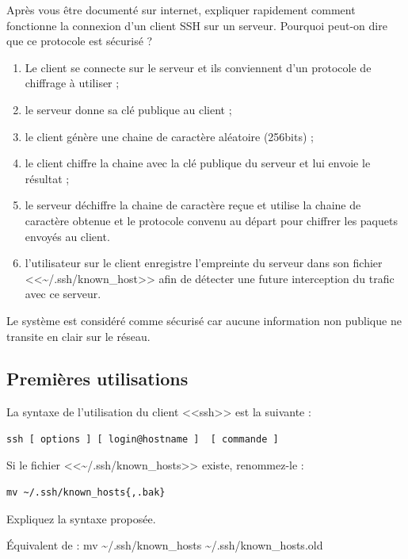 \documentclass[11pt]{article}
\begin{document}
Après vous être documenté sur internet, expliquer rapidement comment fonctionne la connexion d'un client SSH sur un serveur. Pourquoi peut-on dire que ce protocole est sécurisé ?

\begin{solution}
\begin{enumerate}
 \item Le client se connecte sur le serveur et ils conviennent d'un protocole de chiffrage à utiliser ;
 \item le serveur donne sa clé publique au client ;
 \item le client génère une chaine de caractère aléatoire (256bits) ;
 \item le client chiffre la chaine avec la clé publique du serveur et lui envoie le résultat ;
 \item le serveur déchiffre la chaine de caractère reçue et utilise la chaine de caractère obtenue et le protocole convenu au départ pour chiffrer les paquets envoyés au client.
 \item l'utilisateur sur le client enregistre l'empreinte du serveur dans son fichier <<\textasciitilde{}/.ssh/known\_host>> afin de détecter une future interception du trafic avec ce serveur.
\end{enumerate}

Le système est considéré comme sécurisé car aucune information non publique ne transite en clair sur le réseau.

\end{solution}


\subsection{Premières utilisations}

La syntaxe de l'utilisation du client <<ssh>> est la suivante :

\begin{lstlisting}
ssh [ options ] [ login@hostname ]  [ commande ]
\end{lstlisting}

Si le fichier <<\textasciitilde{}/.ssh/known\_hosts>> existe, renommez-le :

\begin{lstlisting}
mv ~/.ssh/known_hosts{,.bak}
\end{lstlisting}

Expliquez la syntaxe proposée.

\begin{solution}

Équivalent de : mv \textasciitilde{}/.ssh/known\_hosts \textasciitilde{}/.ssh/known\_hosts.old
\end{solution}
\end{document}
